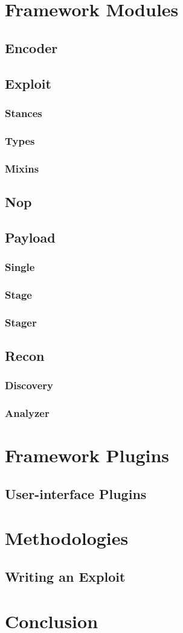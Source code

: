 \documentclass{report}
\begin{document}
\chapter{Framework Modules}
\label{framework-modules}

    \section{Encoder}
    \section{Exploit}
        \subsection{Stances}
        \subsection{Types}
        \subsection{Mixins}
    \section{Nop}
    \section{Payload}
        \subsection{Single}
        \subsection{Stage}
        \subsection{Stager}
    \section{Recon}
        \subsection{Discovery}
        \subsection{Analyzer}
\chapter{Framework Plugins}
\label{framework-plugins}

    \section{User-interface Plugins}
\chapter{Methodologies}
    \section{Writing an Exploit}
\chapter{Conclusion}
\end{document}
